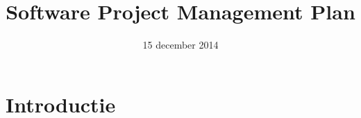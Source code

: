 \documentclass{article}
\title{Software Project Management Plan}
\author{} %
\date{15 december 2014} %
\begin{document}




\tableofcontents
\newpage


\newcommand{\comment}[1]{}



\comment{



sectie 3.1

sectie 3.2

sectie 3.3

sectie 4.1
- Hoe ga je als groep configuration management aanpakken?


Algemeen:
Dit is een vrij uitgebreide eerste versie, met hier en daar nog (vaak zelf aangegeven) punten waar aanvulling noodzakelijk is. Eem werkplan ontbreekt. Probeer zo veel mogelijk aan te vullen voor volgende opleveringen. 
}







\section{Introductie}
\end{document}
